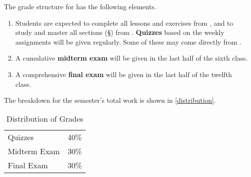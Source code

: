 \documentclass[titlepage]{article}
\newcommand\policy{../policy}
\begin{document}
The grade structure for \ccode has the following elements.

\begin{enumerate}
 \item
    Students are expected to complete all lessons and exercises from
    \cite{bbh}, and to study and master all sections (\S) from
    \cite{tm}. \textbf{Quizzes} based on the weekly assignments will be
    given regularly. Some of these may come directly from \cite{bbh}.
 \item
   A cumulative \textbf{midterm exam} will be given in the last half of
   the sixth class.
 \item
   A comprehensive \textbf{final exam} will be given in the last half of
   the twelfth class.
\end{enumerate}

The breakdown for the semester's total work is shown in
\autoref{distribution}.

\begin{table}[htbp]
  \centering
  {\lining
  \begin{tabular}{lr}
    \toprule
    Quizzes      & 40\% \\
    Midterm Exam & 30\% \\
    Final Exam   & 30\% \\
    \bottomrule
  \end{tabular}}
  \caption{Distribution of Grades}
  \label{distribution}
\end{table}



\end{document}
